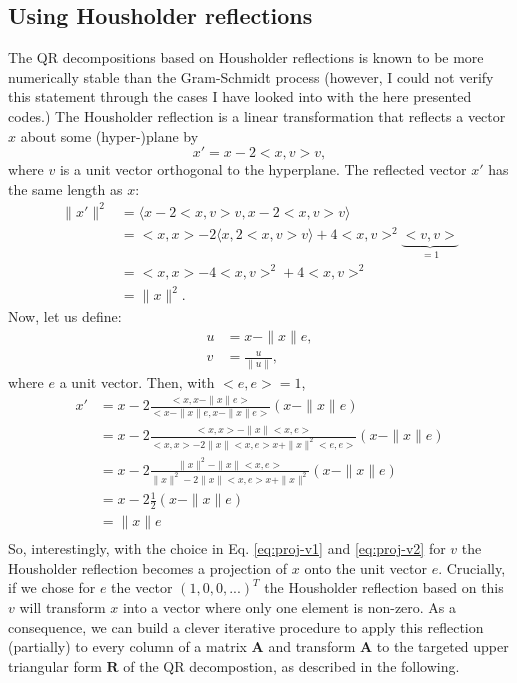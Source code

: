 \documentclass[11pt, a4paper, parskip=half*, bibliography=totoc, cleardoublepage=empty, final,
numbers=noenddot]{scrbook}
\begin{document}
\subsection{Using Housholder reflections}
The QR decompositions based on Housholder reflections is known to be more numerically stable than the Gram-Schmidt process (however, I could not verify this statement through the cases I have looked into with the here presented codes.) The Housholder reflection is a linear transformation that reflects a vector $x$ about some (hyper-)plane by
\begin{equation}
x' = x - 2 <x, v> v, 
\label{eq:housholder}
\end{equation}
where $v$ is a unit vector orthogonal to the hyperplane. The reflected vector $x'$ has the same length as $x$:
\begin{align}
\| x' \|^2 &= \langle x - 2 <x, v> v, x - 2 <x, v> v \rangle \\
&= <x,x> - 2 \langle x, 2 <x, v> v \rangle + 4 <x, v>^2 \underbrace{<v, v>}_{=1}\\
&= <x, x> - 4 <x, v>^2 + 4 <x, v>^2 \\
&= \| x\|^2.
\end{align} 
Now, let us define:
\begin{align}
u &= x - \| x \| e, \label{eq:proj-v1}\\
v &= \frac{u}{\| u \|},
\label{eq:proj-v2}
\end{align}
where $e$ a unit vector. Then, with $<e,e>=1$,
\begin{align}
x' &= x - 2 \frac{<x, x - \| x \| e> }{<x - \| x \|  e, x - \| x \|  e>} (x - \| x \|  e) \\
&= x - 2 \frac{<x, x> - \| x \| <x,  e> }{<x,x> - 2 \| x \| <x, e> x + \| x \|^2 <e, e> } (x - \| x \|  e) \\
&= x - 2 \frac{ \| x \|^2 - \| x \| <x,  e> }{ \| x \|^2 - 2 \| x \| <x, e> x + \| x \|^2  } (x - \| x \|  e) \\
&= x - 2 \frac{1}{2} (x - \| x \|  e) \\
&=  \| x \| e \\
\end{align}
So, interestingly, with the choice in Eq. \ref{eq:proj-v1} and \ref{eq:proj-v2} for $v$ the Housholder reflection becomes a projection of $x$ onto the unit vector $e$. Crucially, if we chose for $e$ the vector $(1, 0, 0, ...)^T$ the Housholder reflection based on this $v$ will transform $x$ into a vector where only one element is non-zero. As a consequence, we can build a clever iterative procedure to apply this reflection (partially) to every column of a matrix $\bm{A}$ and transform $\bm{A}$ to the targeted upper triangular form $\bm{R}$ of the QR decompostion, as described in the following.
\end{document}

